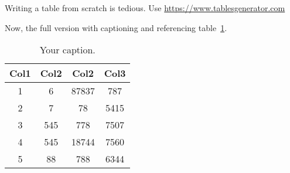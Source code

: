 \documentclass{article}
\begin{document}
\begin{sloppypar}
Writing a table from scratch is tedious. Use \url{https://www.tablesgenerator.com}
\end{sloppypar}

Now, the full version with captioning and referencing table~\ref{tab:demo-table}.

\begin{table}[h]
    \begin{center}
        \begin{tabular}{||c c c c||} 
        \hline
        Col1 & Col2 & Col2 & Col3 \\ [0.5ex] 
        \hline\hline
        1 & 6 & 87837 & 787 \\ 
        \hline
        2 & 7 & 78 & 5415 \\
        \hline
        3 & 545 & 778 & 7507 \\
        \hline
        4 & 545 & 18744 & 7560 \\
        \hline
        5 & 88 & 788 & 6344 \\ [1ex] 
        \hline
        \end{tabular}
    \caption{\label{tab:demo-table}Your caption.}
    \end{center}
\end{table}
\end{document}
